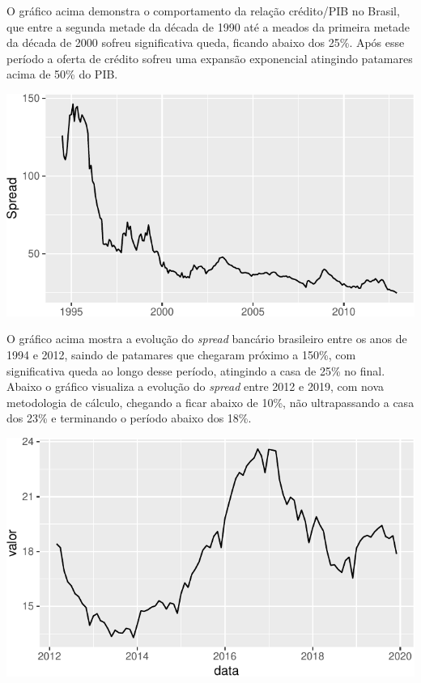 \documentclass[12pt,openright,oneside,a4paper,chapter=TITLE,section=TITLE,subsection=Title,english,french,spanish,portugues,sumario=tradicional]{04-class-files/abntex2}
\begin{document}
\label{fig:credgdp}

O gráfico acima demonstra o comportamento da relação crédito/PIB no Brasil, que entre a segunda metade da década de 1990 até a meados da primeira metade da década de 2000 sofreu significativa queda, ficando abaixo dos 25\%. Após esse período a oferta de crédito sofreu uma expansão exponencial atingindo patamares acima de 50\% do PIB.


\begin{center}\includegraphics{jacksontorres_files/figure-latex/average spread-1} \end{center}

\label{fig:spread2012}

O gráfico acima mostra a evolução do \emph{spread} bancário brasileiro entre os anos de 1994 e 2012, saindo de patamares que chegaram próximo a 150\%, com significativa queda ao longo desse período, atingindo a casa de 25\% no final. Abaixo o gráfico visualiza a evolução do \emph{spread} entre 2012 e 2019, com nova metodologia de cálculo, chegando a ficar abaixo de 10\%, não ultrapassando a casa dos 23\% e terminando o período abaixo dos 18\%.


\begin{center}\includegraphics{jacksontorres_files/figure-latex/spread 2019-1} \end{center}
\end{document}
